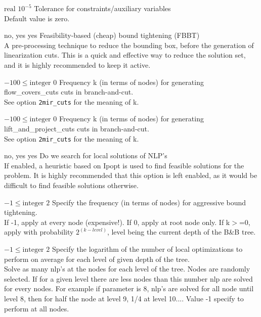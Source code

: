 %
{$\textrm{real}$}%
{$10^{- 5}$}%
{Tolerance for constraints/auxiliary variables\\
Default value is zero.}%
{}

%
{no, yes}%
{yes}%
{Feasibility-based (cheap) bound tightening (FBBT)\\
A pre-processing technique to reduce the bounding box, before the generation of linearization cuts. This is a quick and effective way to reduce the solution set, and it is highly recommended to keep it active.}%
{}

%
{$-100\leq\textrm{integer}$}%
{$0$}%
{Frequency k (in terms of nodes) for generating flow\_covers\_cuts cuts in branch-and-cut.\\
See option \texttt{2mir\_cuts} for the meaning of k.}%
{}

%
{$-100\leq\textrm{integer}$}%
{$0$}%
{Frequency k (in terms of nodes) for generating lift\_and\_project\_cuts cuts in branch-and-cut.\\
See option \texttt{2mir\_cuts} for the meaning of k.}%
{}

%
{no, yes}%
{yes}%
{Do we search for local solutions of NLP's\\
If enabled, a heuristic based on Ipopt is used to find feasible solutions for the problem. It is highly recommended that this option is left enabled, as it would be difficult to find feasible solutions otherwise.}%
{}

%
{$-1\leq\textrm{integer}$}%
{$2$}%
{Specify the frequency (in terms of nodes) for aggressive bound tightening.\\
If -1, apply at every node (expensive!). If 0, apply at root node only. If k$>$=0, apply with probability $2^{(k - level)}$, level being the current depth of the B\&B tree.}%
{}

%
{$-1\leq\textrm{integer}$}%
{$2$}%
{Specify the logarithm of the number of local optimizations to perform on average for each level of given depth of the tree.\\
Solve as many nlp's at the nodes for each level of the tree. Nodes are randomly selected. If for a given level there are less nodes than this number nlp are solved for every nodes. For example if parameter is 8, nlp's are solved for all node until level 8, then for half the node at level 9, 1/4 at level 10.... Value -1 specify to perform at all nodes.}%
{}


